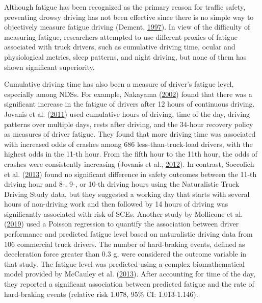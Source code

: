 \documentclass[12pt]{book}
\numberwithin{equation}{chapter}
\begin{document}
Although fatigue has been recognized as the primary reason for traffic safety, preventing drowsy driving has not been effective since there is no simple way to objectively measure fatigue driving (Dement, \protect\hyperlink{ref-dement1997perils}{1997}). In view of the difficulty of measuring fatigue, researchers attempted to use different proxies of fatigue associated with truck drivers, such as cumulative driving time, ocular and physiological metrics, sleep patterns, and night driving, but none of them has shown significant superiority.

Cumulative driving time has also been a measure of driver's fatigue level, especially among NDSs. For example, Nakayama (\protect\hyperlink{ref-nakayama2002trial}{2002}) found that there was a significant increase in the fatigue of drivers after 12 hours of continuous driving. Jovanis et al. (\protect\hyperlink{ref-jovanis2011hours}{2011}) used cumulative hours of driving, time of the day, driving patterns over multiple days, rests after driving, and the 34-hour recovery policy as measures of driver fatigue. They found that more driving time was associated with increased odds of crashes among 686 less-than-truck-load drivers, with the highest odds in the 11-th hour. From the fifth hour to the 11th hour, the odds of crashes were consistently increasing (Jovanis et al., \protect\hyperlink{ref-jovanis2012effects}{2012}). In contrast, Soccolich et al. (\protect\hyperlink{ref-soccolich2013analysis}{2013}) found no significant difference in safety outcomes between the 11-th driving hour and 8-, 9-, or 10-th driving hours using the Naturalistic Truck Driving Study data, but they suggested a working day that starts with several hours of non-driving work and then followed by 14 hours of driving was significantly associated with risk of SCEs. Another study by Mollicone et al. (\protect\hyperlink{ref-mollicone2019predicting}{2019}) used a Poisson regression to quantify the association between driver performance and predicted fatigue level based on naturalistic driving data from 106 commercial truck drivers. The number of hard-braking events, defined as deceleration force greater than 0.3 g, were considered the outcome variable in that study. The fatigue level was predicted using a complex biomathematical model provided by McCauley et al. (\protect\hyperlink{ref-mccauley2013dynamic}{2013}). After accounting for time of the day, they reported a significant association between predicted fatigue and the rate of hard-braking events (relative risk 1.078, 95\% CI: 1.013-1.146).
\end{document}

